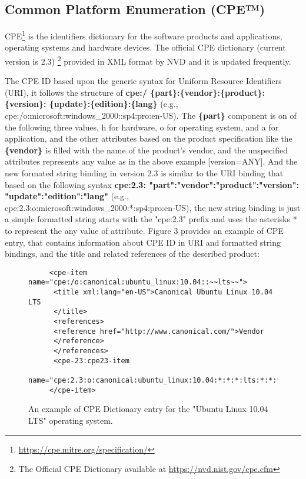 \documentclass{llncs}
\begin{document}
 
 
 \subsection{Common Platform Enumeration (CPE™)}
 CPE\footnote{\url{https://cpe.mitre.org/specification/}} is the identifiers dictionary for the software products and applications, operating systems and hardware devices. The official CPE dictionary (current version is 2.3) \footnote{The Official CPE Dictionary available at \url{https://nvd.nist.gov/cpe.cfm}} provided in XML format by NVD and it is updated frequently.
 \par The CPE ID based upon the generic syntax for Uniform Resource Identifiers (URI), it follows the structure of \textbf{cpe:/ \{part\}:\{vendor\}:\{product\}:\{version\}:
 \{update\}:\{edition\}:\{lang\}} (e.g., cpe:/o:microsoft:windows\_2000::sp4:pro:en-US). The \textbf{\{part\}} component is on of the following three values, h for hardware, o for operating system, and a for application, and the other attributes based on the product specification like the \textbf{\{vendor\}} is filled with the name of the product's vendor, and the unspecified attributes represents any value as in the above example [version=ANY]. And  the new formated string binding in version 2.3  is similar to the URI binding that based on the following syntax \textbf{cpe:2.3: "part":"vendor":"product":"version":
  "update":"edition":"lang"} (e.g., cpe:2.3:o:microsoft:windows\_2000:*:sp4:pro:en-US), the new string binding is just a simple formatted string starts with the  "cpe:2.3" prefix and uses the asterisks * to represent the any value of attribute. Figure 3 provides an example of CPE entry, that contains information about CPE ID in URI and formatted string bindings, and the title and related references of the described product: 
  
  \begin{figure}
   
     \lstset{language=XML}
      \begin{lstlisting}
     <cpe-item name="cpe:/o:canonical:ubuntu_linux:10.04::~~lts~~">
      <title xml:lang="en-US">Canonical Ubuntu Linux 10.04 LTS
      </title>
      <references>
      <reference href="http://www.canonical.com/">Vendor
      </reference>
      </references>
      <cpe-23:cpe23-item
      name="cpe:2.3:o:canonical:ubuntu_linux:10.04:*:*:*:lts:*:*:*"/>
     </cpe-item>
      \end{lstlisting}
     \caption{An example of CPE Dictionary entry for the "Ubuntu Linux 10.04 LTS" operating system.}
      \end{figure}
  
\end{document}
